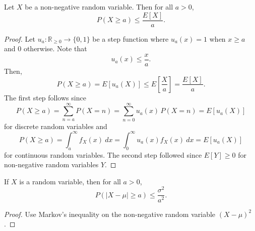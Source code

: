 \documentclass[11pt]{article}
\def\R{\mathbb{R}}
\newcommand\E[1]{E\left[#1\right]}
\theoremstyle{definition}
\theoremstyle{remark}
\numberwithin{equation}{module}
\begin{document}
    \begin{theorem}
        Let $X$ be a non-negative random variable. Then for all $a > 0$, \[
            P(X \geq a) \leq \frac{\E{X}}{a}.
        \] 
    \end{theorem}
    \begin{proof}
        Let $u_a\colon \R_{\geq 0} \to \{0, 1\}$ be a step function where
        $u_a(x) = 1$ when $x \geq a$ and $0$ otherwise. Note that \[
            u_a(x) \leq \frac{x}{a}.
        \] Then, \[
            P(X \geq a) = \E{u_a(X)} \leq \E{\frac{X}{a}} = \frac{\E{X}}{a}.
        \] The first step follows since \[
            P(X \geq a) = \sum_{n = a}^\infty P(X = n) = \sum_{n = 0}^\infty
            u_a(x)\,P(X = n) = \E{u_a(X)}
        \] for discrete random variables and \[
            P(X \geq a) = \int_a^\infty f_X(x)\:dx = \int_{0}^{\infty}
            u_a(x)f_X(x)\:dx = \E{u_a(X)}
        \] for continuous random variables.
        The second step followed since $\E{Y} \geq 0$ for non-negative random
        variables $Y$.
    \end{proof}
    \begin{corollary}
        If $X$ is a random variable, then for all $a > 0$, \[
            P(|X - \mu| \geq a) \leq \frac{\sigma^2}{a^2}.
        \] 
    \end{corollary}
    \begin{proof}
        Use Markov's inequality on the non-negative random variable $(X - \mu)^2$.
    \end{proof}
\end{document}
